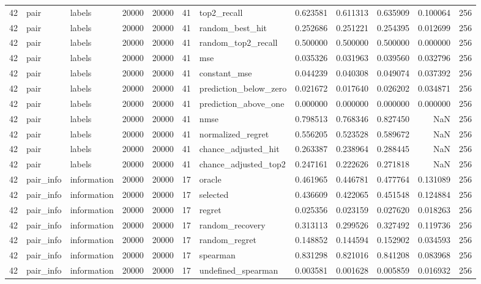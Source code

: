 \begin{tabular}{rllrrrlrrrrr}
42 & pair & labels & 20000 & 20000 & 41 & top2_recall & 0.623581 & 0.611313 & 0.635909 & 0.100064 & 256 \\
42 & pair & labels & 20000 & 20000 & 41 & random_best_hit & 0.252686 & 0.251221 & 0.254395 & 0.012699 & 256 \\
42 & pair & labels & 20000 & 20000 & 41 & random_top2_recall & 0.500000 & 0.500000 & 0.500000 & 0.000000 & 256 \\
42 & pair & labels & 20000 & 20000 & 41 & mse & 0.035326 & 0.031963 & 0.039560 & 0.032796 & 256 \\
42 & pair & labels & 20000 & 20000 & 41 & constant_mse & 0.044239 & 0.040308 & 0.049074 & 0.037392 & 256 \\
42 & pair & labels & 20000 & 20000 & 41 & prediction_below_zero & 0.021672 & 0.017640 & 0.026202 & 0.034871 & 256 \\
42 & pair & labels & 20000 & 20000 & 41 & prediction_above_one & 0.000000 & 0.000000 & 0.000000 & 0.000000 & 256 \\
42 & pair & labels & 20000 & 20000 & 41 & nmse & 0.798513 & 0.768346 & 0.827450 & NaN & 256 \\
42 & pair & labels & 20000 & 20000 & 41 & normalized_regret & 0.556205 & 0.523528 & 0.589672 & NaN & 256 \\
42 & pair & labels & 20000 & 20000 & 41 & chance_adjusted_hit & 0.263387 & 0.238964 & 0.288445 & NaN & 256 \\
42 & pair & labels & 20000 & 20000 & 41 & chance_adjusted_top2 & 0.247161 & 0.222626 & 0.271818 & NaN & 256 \\
42 & pair_info & information & 20000 & 20000 & 17 & oracle & 0.461965 & 0.446781 & 0.477764 & 0.131089 & 256 \\
42 & pair_info & information & 20000 & 20000 & 17 & selected & 0.436609 & 0.422065 & 0.451548 & 0.124884 & 256 \\
42 & pair_info & information & 20000 & 20000 & 17 & regret & 0.025356 & 0.023159 & 0.027620 & 0.018263 & 256 \\
42 & pair_info & information & 20000 & 20000 & 17 & random_recovery & 0.313113 & 0.299526 & 0.327492 & 0.119736 & 256 \\
42 & pair_info & information & 20000 & 20000 & 17 & random_regret & 0.148852 & 0.144594 & 0.152902 & 0.034593 & 256 \\
42 & pair_info & information & 20000 & 20000 & 17 & spearman & 0.831298 & 0.821016 & 0.841208 & 0.083968 & 256 \\
42 & pair_info & information & 20000 & 20000 & 17 & undefined_spearman & 0.003581 & 0.001628 & 0.005859 & 0.016932 & 256 \\

\end{tabular}
